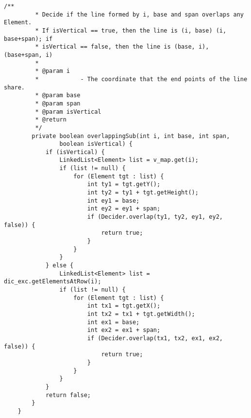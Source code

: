 \begin{lstlisting}[caption=ElementDictionary, label=listing2]
		/**
		 * Decide if the line formed by i, base and span overlaps any Element.
		 * If isVertical == true, then the line is (i, base) (i, base+span); if
		 * isVertical == false, then the line is (base, i), (base+span, i)
		 * 
		 * @param i
		 *            - The coordinate that the end points of the line share.
		 * @param base
		 * @param span
		 * @param isVertical
		 * @return
		 */
		private boolean overlappingSub(int i, int base, int span,
				boolean isVertical) {
			if (isVertical) {
				LinkedList<Element> list = v_map.get(i);
				if (list != null) {
					for (Element tgt : list) {
						int ty1 = tgt.getY();
						int ty2 = ty1 + tgt.getHeight();
						int ey1 = base;
						int ey2 = ey1 + span;
						if (Decider.overlap(ty1, ty2, ey1, ey2, false)) {
							return true;
						}
					}
				}
			} else {
				LinkedList<Element> list = dic_exc.getElementsAtRow(i);
				if (list != null) {
					for (Element tgt : list) {
						int tx1 = tgt.getX();
						int tx2 = tx1 + tgt.getWidth();
						int ex1 = base;
						int ex2 = ex1 + span;
						if (Decider.overlap(tx1, tx2, ex1, ex2, false)) {
							return true;
						}
					}
				}
			}
			return false;
		}
	}
\end{lstlisting}

